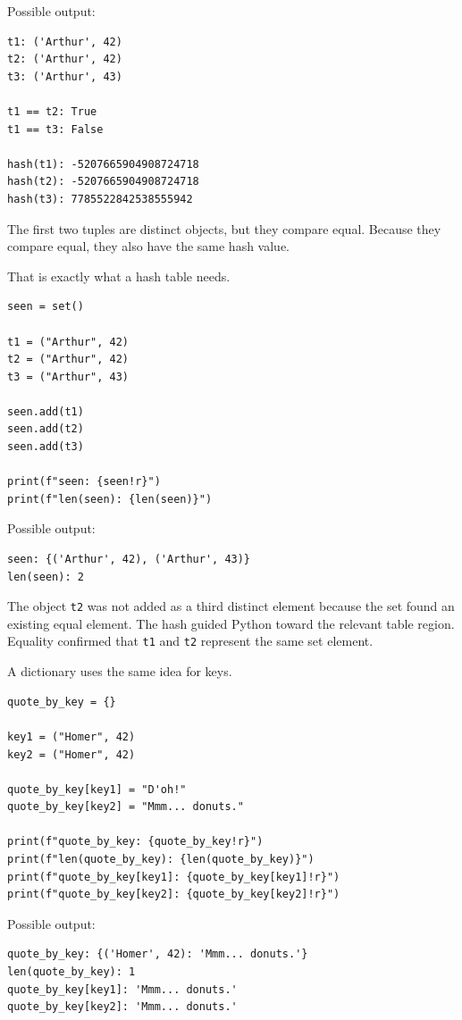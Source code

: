 Possible output:

\begin{verbatim}
t1: ('Arthur', 42)
t2: ('Arthur', 42)
t3: ('Arthur', 43)

t1 == t2: True
t1 == t3: False

hash(t1): -5207665904908724718
hash(t2): -5207665904908724718
hash(t3): 7785522842538555942
\end{verbatim}

The first two tuples are distinct objects, but they compare equal. Because they compare equal, they also have the same hash value.

That is exactly what a hash table needs.

\begin{verbatim}
seen = set()

t1 = ("Arthur", 42)
t2 = ("Arthur", 42)
t3 = ("Arthur", 43)

seen.add(t1)
seen.add(t2)
seen.add(t3)

print(f"seen: {seen!r}")
print(f"len(seen): {len(seen)}")
\end{verbatim}

Possible output:

\begin{verbatim}
seen: {('Arthur', 42), ('Arthur', 43)}
len(seen): 2
\end{verbatim}

The object \texttt{t2} was not added as a third distinct element because the set found an existing equal element. The hash guided Python toward the relevant table region. Equality confirmed that \texttt{t1} and \texttt{t2} represent the same set element.

A dictionary uses the same idea for keys.

\begin{verbatim}
quote_by_key = {}

key1 = ("Homer", 42)
key2 = ("Homer", 42)

quote_by_key[key1] = "D'oh!"
quote_by_key[key2] = "Mmm... donuts."

print(f"quote_by_key: {quote_by_key!r}")
print(f"len(quote_by_key): {len(quote_by_key)}")
print(f"quote_by_key[key1]: {quote_by_key[key1]!r}")
print(f"quote_by_key[key2]: {quote_by_key[key2]!r}")
\end{verbatim}

Possible output:

\begin{verbatim}
quote_by_key: {('Homer', 42): 'Mmm... donuts.'}
len(quote_by_key): 1
quote_by_key[key1]: 'Mmm... donuts.'
quote_by_key[key2]: 'Mmm... donuts.'
\end{verbatim}

